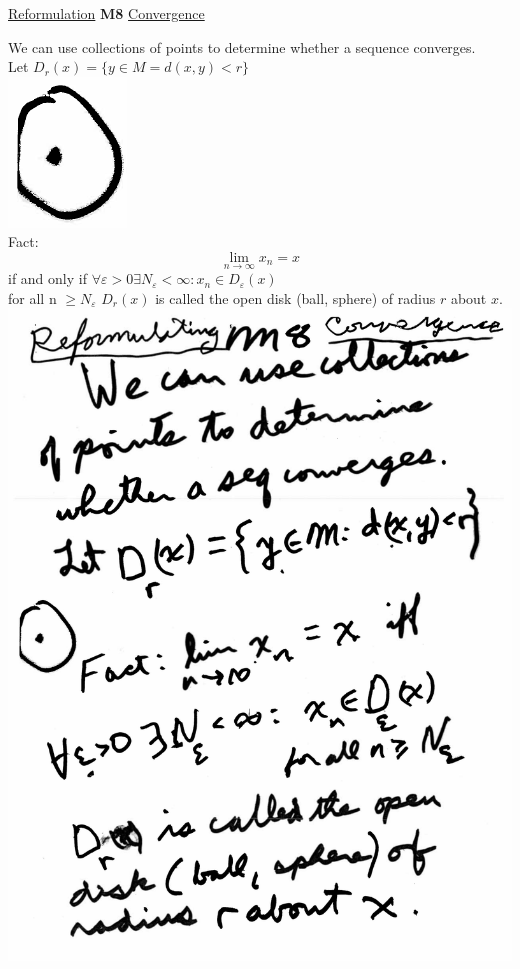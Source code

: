 \documentclass[10pt,a4paper]{article}
\begin{document}
{{%
\newpage
\Large
\center \underline{Reformulation} {\bf M8} \underline{Convergence}
\begin{flushleft}
We can use collections of points to determine whether a sequence converges. \\Let $D_r(x) = \{y\in M = d(x,y) <r\}$\\
\includegraphics[scale=.5]{Pages/MS_8_Im}
\\Fact: $$\lim_{n\rightarrow \infty} x_n = x $$ if and only if  
$\forall \varepsilon > 0 \exists N_{\varepsilon} < \infty: x_n \in D_{\varepsilon}(x)$\\for all n $\geqslant N_{\varepsilon}$
$D_r(x)$ is called the open disk (ball, sphere) of radius $r$ about $x$.\\
\includegraphics[scale=.4]{Pages/MS_8}
\newpage


\end{flushleft}}}
\end{document}
